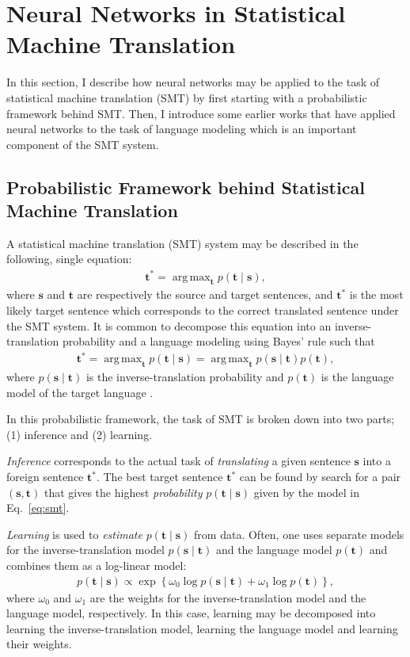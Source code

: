 \documentclass[11pt, oneside]{essay}
\newcommand{\vect}[1]{\mathbf{#1}}
\newcommand{\vs}[0]{\vect{s}}
\newcommand{\vt}[0]{\vect{t}}
\DeclareMathOperator*{\argmax}{arg\,max}
\begin{document}
\section{Neural Networks in Statistical Machine Translation}
\label{sec:smt}

In this section, I describe how neural networks may be applied to
the task of statistical machine translation (SMT) by first
starting with a probabilistic framework behind SMT. Then, I
introduce some earlier works that have applied neural networks to
the task of language modeling which is an important component of
the SMT system.

\subsection{Probabilistic Framework behind Statistical Machine
Translation}
\label{sec:smt-basic}

A statistical machine translation (SMT) system may be described
in the following, single equation:
\begin{align}
    \label{eq:smt_fund}
    \vt^* = \argmax_{\vt} p(\vt \mid \vs),
\end{align}
where $\vs$ and $\vt$ are respectively the source and target
sentences, and $\vt^*$ is the most likely target sentence which
corresponds to the correct translated sentence under the SMT
system. It is common to decompose this equation into an
inverse-translation probability and a language modeling using
Bayes' rule such that
\begin{align}
    \label{eq:smt}
    \vt^* = \argmax_{\vt} p(\vt \mid \vs) 
    = \argmax_{\vt} p(\vs \mid \vt) p(\vt),
\end{align}
where $p(\vs \mid \vt)$ is the inverse-translation probability
and $p(\vt)$ is the language model of the target language
\citep{Koehn2010}.

In this probabilistic framework, the task of SMT is broken down
into two parts; (1) inference and (2) learning. 

\textit{Inference} corresponds to the actual task of \textit{translating} a
given sentence $\vs$ into a foreign sentence $\vt^*$. The best
target sentence $\vt^*$ can be found by search for a pair
$\left(\vs, \vt\right)$ that gives the highest
\textit{probability} $p(\vt \mid \vs)$ given by the model in
Eq.~\eqref{eq:smt}.

\textit{Learning} is used to \textit{estimate} $p(\vt \mid \vs)$
from data.  Often, one uses separate models for the
inverse-translation model $p(\vs \mid \vt)$ and the language
model $p(\vt)$ and combines them as a log-linear model:
\begin{align}
    \label{eq:loglinear}
    p(\vt \mid \vs) \propto \exp\left\{ \omega_0 \log p(\vs \mid
    \vt) + \omega_1 \log p(\vt) \right\}, 
\end{align}
where $\omega_0$ and $\omega_1$ are the weights for the
inverse-translation model and the language model, respectively.
In this case, learning may be decomposed into learning the
inverse-translation model, learning the language model and
learning their weights.
\end{document}
